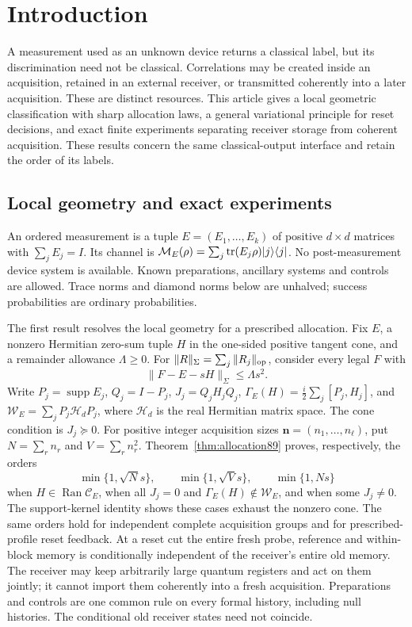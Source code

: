 \section{Introduction}\label{sec:introduction84}
A measurement used as an unknown device returns a classical label, but
its discrimination need not be classical.  Correlations may be created
inside an acquisition, retained in an external receiver, or transmitted
coherently into a later acquisition.  These are distinct resources.
This article gives a local geometric classification with sharp allocation
laws, a general variational principle for reset decisions, and exact
finite experiments separating receiver storage from coherent acquisition.  These results concern the same classical-output
interface and retain the order of its labels.

\subsection{Local geometry and exact experiments}
An ordered measurement is a tuple $E=(E_1,\ldots,E_k)$ of positive
$d\times d$ matrices with $\sum_jE_j=I$.  Its channel is
$\mathcal M_E(\rho)=\sum_j\operatorname{tr}(E_j\rho)|j\rangle\langle j|$.
No post-measurement device system is available.  Known preparations,
ancillary systems and controls are allowed.  Trace norms and diamond
norms below are unhalved; success probabilities are ordinary probabilities.

The first result resolves the local geometry for a prescribed allocation.
Fix $E$, a nonzero Hermitian zero-sum tuple $H$ in the one-sided positive
tangent cone, and a remainder allowance $\Lambda\ge0$.  For
$\|R\|_\Sigma=\sum_j\|R_j\|_{\rm op}$, consider every legal $F$ with
\begin{equation}\label{eq:fronttube87}
 \|F-E-sH\|_\Sigma\le\Lambda s^2.
\end{equation}
Write $P_j=\operatorname{supp}E_j$, $Q_j=I-P_j$,
$J_j=Q_jH_jQ_j$, $\Gamma_E(H)=\frac i2\sum_j[P_j,H_j]$, and
$\mathcal W_E=\sum_jP_j\mathcal H_dP_j$, where $\mathcal H_d$ is the
real Hermitian matrix space.  The cone condition is $J_j\succeq0$.
For positive integer acquisition sizes $\boldsymbol n=(n_1,\ldots,n_\ell)$,
put $N=\sum_rn_r$ and $V=\sum_rn_r^2$.
Theorem~\ref{thm:allocation89} proves, respectively, the orders
\begin{equation}\label{eq:frontprofile89}
 \min\{1,\sqrt N s\},\qquad \min\{1,\sqrt V s\},\qquad \min\{1,Ns\}
\end{equation}
when $H\in\operatorname{Ran}\mathcal C_E$, when all $J_j=0$ and
$\Gamma_E(H)\notin\mathcal W_E$, and when some $J_j\ne0$.
The support-kernel identity shows these cases exhaust the nonzero cone.
The same orders hold for independent complete acquisition groups and
for prescribed-profile reset feedback.  At a reset cut the entire fresh
probe, reference and within-block memory is conditionally independent
of the receiver's entire old memory.  The receiver may keep arbitrarily
large quantum registers and act on them jointly; it cannot import them
coherently into a fresh acquisition.  Preparations and controls are one
common rule on every formal history, including null histories.  The
conditional old receiver states need not coincide.

